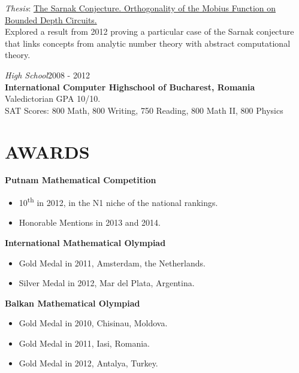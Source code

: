 \documentclass[margin]{res}
\begin{document}
\begin{resume}
  {\sl Thesis\/}: \href{http://math.harvard.edu/theses/senior/dragoi/dragoi.pdf}
  {The Sarnak Conjecture. Orthogonality of the Mobius Function on Bounded Depth Circuits.} \\
  Explored a result from 2012 proving a particular case of the Sarnak conjecture that links
  concepts from analytic number theory with abstract computational theory.
  \vspace{-6pt}

  {\sl High School}\hfill 2008 - 2012 \\
  \textbf{International Computer Highschool of Bucharest, Romania}\\
  Valedictorian GPA 10/10.\\
  SAT Scores: 800 Math, 800 Writing, 750 Reading, 800 Math II, 800 Physics
  \vspace{8pt}

  \section{AWARDS} \textbf{Putnam Mathematical Competition}
  \begin{itemize} \itemsep -2pt
    \item 10\textsuperscript{th} in 2012, in the N1 niche of the national rankings.
    \item Honorable Mentions in 2013 and 2014.
  \end{itemize}
  \textbf{International Mathematical Olympiad}
  \begin{itemize} \itemsep -1pt
    \item Gold Medal in 2011, Amsterdam, the Netherlands.
    \item Silver Medal in 2012, Mar del Plata, Argentina.
  \end{itemize}
  \textbf{Balkan Mathematical Olympiad}
  \begin{itemize} \itemsep -1pt
    \item Gold Medal in 2010, Chisinau, Moldova.
    \item Gold Medal in 2011, Iasi, Romania.
    \item Gold Medal in 2012, Antalya, Turkey.
  \end{itemize}
  \newpage


\end{resume}
\end{document}
